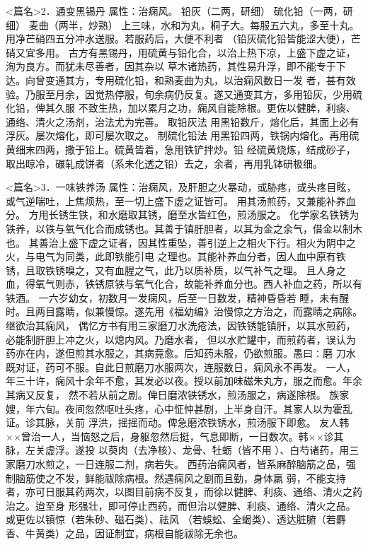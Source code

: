 \documentclass[a4paper,12pt,UTF8,twoside]{ctexbook}
\begin{document}
<篇名>2．通变黑锡丹
属性：治痫风。 
铅灰（二两，研细） 硫化铅（一两，研细） 麦曲（两半，炒熟） 
上三味，水和为丸，桐子大。每服五六丸，多至十丸。用净芒硝四五分冲水送服。若服药后，大便不利者 
（铅灰硫化铅皆能涩大便），芒硝又宜多用。 
古方有黑锡丹，用硫黄与铅化合，以治上热下凉，上盛下虚之证，洵为良方。而犹未尽善者，因其杂以 
草木诸热药，其性易升浮，即不能专于下达。向曾变通其方，专用硫化铅，和熟麦曲为丸，以治痫风数日一发 
者，甚有效验。乃服至月余，因觉热停服，旬余病仍反复。遂又通变其方，多用铅灰，少用硫化铅，俾其久服 
不致生热，加以累月之功，痫风自能除根。更佐以健脾，利痰、通络、清火之汤剂，治法尤为完善。 
取铅灰法 用黑铅数斤，熔化后，其面上必有浮灰。屡次熔化，即可屡次取之。 
制硫化铅法 用黑铅四两，铁锅内熔化。再用硫黄细末四两，撒于铅上。硫黄皆着，急用铁铲拌炒。铅 
经硫黄烧炼，结成砂子，取出晾冷，碾轧成饼者（系未化透之铅）去之，余者，再用乳钵研极细。 


<篇名>3．一味铁养汤
属性：治痫风，及肝胆之火暴动，或胁疼，或头疼目眩，或气逆喘吐，上焦烦热，至一切上盛下虚之证皆可。 
用其汤煎药，又兼能补养血分。 
方用长锈生铁，和水磨取其锈，磨至水皆红色，煎汤服之。 
化学家名铁锈为铁养，以铁与氧气化合而成锈也。其善于镇肝胆者，以其为金之余气，借金以制木也。 
其善治上盛下虚之证者，因其性重坠，善引逆上之相火下行。相火为阴中之火，与电气为同类，此即铁能引电 
之理也。其能补养血分者，因人血中原有铁锈，且取铁锈嗅之，又有血腥之气，此乃以质补质，以气补气之理。 
且人身之血，得氧气则赤，铁锈原铁与氧气化合，故能补养血分也。西人补血之药，所以有铁酒。 
一六岁幼女，初数月一发痫风，后至一日数发，精神昏昏若 
睡，未有醒时。且两目露睛，似兼慢惊。遂先用《福幼编》治慢惊之方治之，而露睛之病除。继欲治其痫风， 
偶忆方书有用三家磨刀水洗疮法，因铁锈能镇肝，以其水煎药，必能制肝胆上冲之火，以熄内风。乃磨水者， 
但以水贮罐中，而煎药者，误认为药亦在内，遂但煎其水服之，其病竟愈。后知药未服，仍欲煎服。愚曰∶磨 
刀水既对证，药可不服。自此日煎磨刀水服两次，连服数日，痫风永不再发。 
一人，年三十许，痫风十余年不愈，其发必以夜。授以前加味磁朱丸方，服之而愈。年余其病又反复， 
然不若从前之剧。俾日磨浓铁锈水，煎汤服之，病遂除根。 
族家嫂，年六旬。夜间忽然呕吐头疼，心中怔忡甚剧，上半身自汗。其家人以为霍乱证。诊其脉，关前 
浮洪，摇摇而动。俾急磨浓铁锈水，煎汤服下即愈。 
友人韩××曾治一人，当恼怒之后，身躯忽然后挺，气息即断，一日数次。韩××诊其脉，左关虚浮。遂投 
以萸肉（去净核）、龙骨、牡蛎（皆不用 ）、白芍诸药，用三家磨刀水煎之，一日连服二剂，病若失。 
西药治痫风者，皆系麻醉脑筋之品，强制脑筋使之不发，鲜能祓除病根。然遇痫风之剧而且勤，身体羸 
弱，不能支持者，亦可日服其药两次，以图目前病不反复，而徐以健脾、利痰、通络、清火之药治之。迨至身 
形强壮，即可停止西药，而但治以健脾、利痰、通络、清火之品。或更佐以镇惊（若朱砂、磁石类）、祛风 
（若蜈蚣、全蝎类）、透达脏腑（若麝香、牛黄类）之品，因证制宜，病根自能祓除无余也。 
\end{document}
